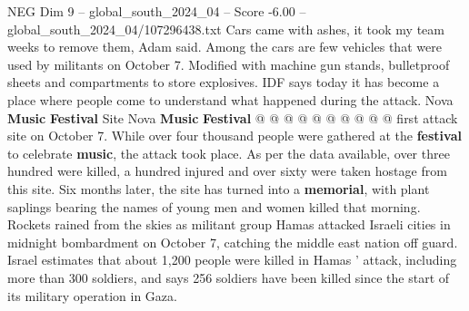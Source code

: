 \begin{textsample}{NEG Dim 9 – global\_south\_2024\_04 – Score -6.00 – global\_south\_2024\_04/107296438.txt}
Cars came with ashes, it took my team weeks to remove them, Adam said.
Among the cars are few vehicles that were used by militants on October 7.
Modified with machine gun stands, bulletproof sheets and compartments to store explosives.
IDF says today it has become a place where people come to understand what happened during the attack.
Nova \textbf{Music} \textbf{Festival} Site Nova \textbf{Music} \textbf{Festival} @ @ @ @ @ @ @ @ @ @ first attack site on October 7.
While over four thousand people were gathered at the \textbf{festival} to celebrate \textbf{music}, the attack took place.
As per the data available, over three hundred were killed, a hundred injured and over sixty were taken hostage from this site.
Six months later, the site has turned into a \textbf{memorial}, with plant saplings bearing the names of young men and women killed that morning.
Rockets rained from the skies as militant group Hamas attacked Israeli cities in midnight bombardment on October 7, catching the middle east nation off guard.
Israel estimates that about 1,200 people were killed in Hamas ' attack, including more than 300 soldiers, and says 256 soldiers have been killed since the start of its military operation in Gaza.

\end{textsample}
